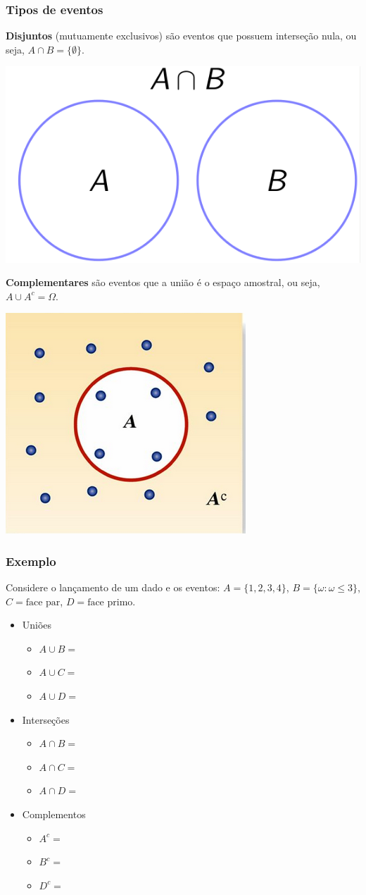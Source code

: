 \documentclass[11pt]{beamer}
\begin{document}
\begin{frame}
\frametitle{Tipos de eventos}

  \textbf{Disjuntos} (mutuamente exclusivos) são eventos que possuem
  interseção nula, ou seja, \(A\cap B = \{\emptyset\}\). \scriptsize

\begin{center}\includegraphics[width=0.25\linewidth]{figs/Disjuntos} \end{center}

  \textbf{Complementares} são eventos que a união é o espaço amostral,
  ou seja, \(A\cup A^{c} = \Omega\). \scriptsize

\begin{center}\includegraphics[width=0.25\linewidth]{figs/Comp} \end{center}
\end{frame}

\begin{frame}
\frametitle{Exemplo}

Considere o lançamento de um dado e os eventos: \(A = \{1,2,3,4\}\),
\(B = \{\omega:\omega\leq 3\}\), \(C = \text{face par}\),
\(D = \text{face
primo}\).

\begin{itemize}
\item
  Uniões

  \begin{itemize}
  \item
    \(A\cup B =\)
  \item
    \(A\cup C =\)
  \item
    \(A\cup D =\)
  \end{itemize}
\item
  Interseções

  \begin{itemize}
  \item
    \(A\cap B =\)
  \item
    \(A\cap C =\)
  \item
    \(A\cap D =\)
  \end{itemize}
\item
  Complementos

  \begin{itemize}
  \item
    \(A^c =\)
  \item
    \(B^c =\)
  \item
    \(D^c =\)
  \end{itemize}
\end{itemize}
\end{frame}
\end{document}
